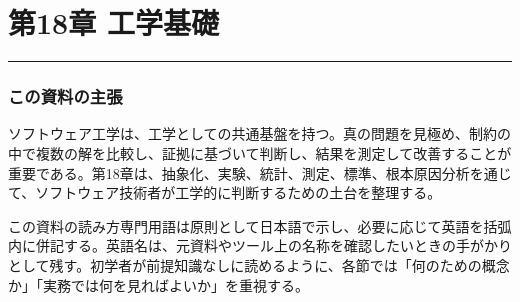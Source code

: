 \section{第18章 工学基礎}
\hrule
\subsubsection*{この資料の主張}
ソフトウェア工学は、工学としての共通基盤を持つ。真の問題を見極め、制約の中で複数の解を比較し、証拠に基づいて判断し、結果を測定して改善することが重要である。第18章は、抽象化、実験、統計、測定、標準、根本原因分析を通じて、ソフトウェア技術者が工学的に判断するための土台を整理する。
\begin{notebox}{この資料の読み方}専門用語は原則として日本語で示し、必要に応じて英語を括弧内に併記する。英語名は、元資料やツール上の名称を確認したいときの手がかりとして残す。初学者が前提知識なしに読めるように、各節では「何のための概念か」「実務では何を見ればよいか」を重視する。\end{notebox}
